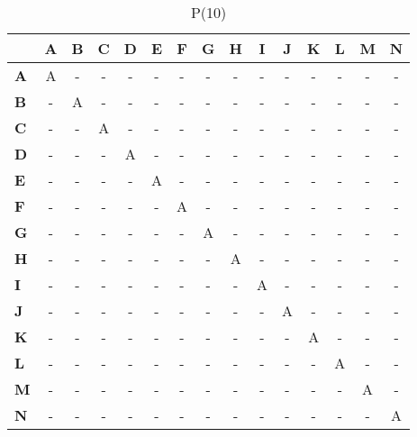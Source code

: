 \documentclass{article}
\begin{document}
\begin{table}[H]\centering
\caption{P(10)}
\begin{tabular}{l c c c c c c c c c c c c c c}
\toprule
 & \textbf{A} & \textbf{B} & \textbf{C} & \textbf{D} & \textbf{E} & \textbf{F} & \textbf{G} & \textbf{H} & \textbf{I} & \textbf{J} & \textbf{K} & \textbf{L} & \textbf{M} & \textbf{N}\\\midrule
\textbf{A} & A & - & - & - & - & - & - & - & - & - & - & - & - & - \\
\textbf{B} & - & A & - & - & - & - & - & - & - & - & - & - & - & - \\
\textbf{C} & - & - & A & - & - & - & - & - & - & - & - & - & - & - \\
\textbf{D} & - & - & - & A & - & - & - & - & - & - & - & - & - & - \\
\textbf{E} & - & - & - & - & A & - & - & - & - & - & - & - & - & - \\
\textbf{F} & - & - & - & - & - & A & - & - & - & - & - & - & - & - \\
\textbf{G} & - & - & - & - & - & - & A & - & - & - & - & - & - & - \\
\textbf{H} & - & - & - & - & - & - & - & A & - & - & - & - & - & - \\
\textbf{I} & - & - & - & - & - & - & - & - & A & - & - & - & - & - \\
\textbf{J} & - & - & - & - & - & - & - & - & - & A & - & - & - & - \\
\textbf{K} & - & - & - & - & - & - & - & - & - & - & A & - & - & - \\
\textbf{L} & - & - & - & - & - & - & - & - & - & - & - & A & - & - \\
\textbf{M} & - & - & - & - & - & - & - & - & - & - & - & - & A & - \\
\textbf{N} & - & - & - & - & - & - & - & - & - & - & - & - & - & A \\
\bottomrule
\end{tabular}
\end{table}
\end{document}
